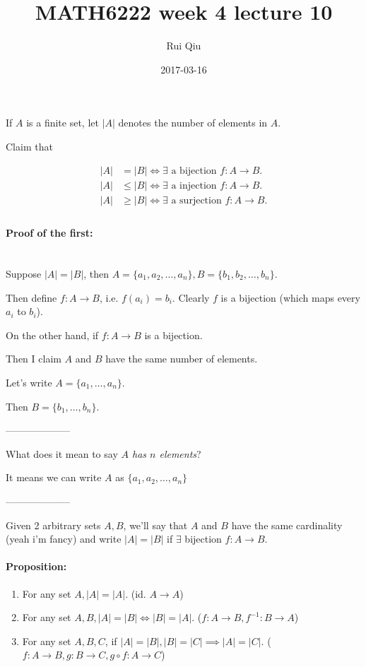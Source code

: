 \documentclass[a4paper, 11pt, twoside]{article}
\begin{document}
\title{MATH6222 week 4 lecture 10}
\author{Rui Qiu}
\date{2017-03-16}

\maketitle

If $A$ is a finite set, let $|A|$ denotes the number of elements in $A$.

Claim that

\[
\begin{split}
	|A|&=|B| \iff \exists \text{ a bijection } f: A\to B.\\	
	|A|&\leq |B| \iff \exists \text{ a injection } f: A\to B.\\
	|A|&\geq |B| \iff \exists \text{ a surjection } f: A \to B.\\
\end{split}
\]

\paragraph{Proof of the first:}\ \\

Suppose $|A|=|B|$, then $A=\{a_1, a_2, \dots, a_n\}, B=\{b_1,b_2,\dots, b_n\}.$

Then define $f:A\to B$, i.e. $f(a_i)=b_i.$ Clearly $f$ is a bijection (which maps every $a_i$ to $b_i$).

On the other hand, if $f:A\to B$ is a bijection.

Then I claim $A$ and $B$ have the same number of elements.

Let's write $A=\{a_1, \dots, a_n\}.$

Then $B=\{b_1,\dots, b_n\}.$

--------------------

What does it mean to say \textit{$A$ has $n$ elements}?

It means we can write $A$ as $\{a_1, a_2, \dots, a_n\}$

--------------------

Given 2 arbitrary sets $A, B$, we'll say that $A$ and $B$ have the same cardinality (yeah i'm fancy) and write $|A|=|B|$ if $\exists$ bijection $f:A\to B$.\\

\paragraph{Proposition:}
\begin{enumerate}
	\item For any set $A, |A|=|A|.$ (id. $A\to A$)
	\item For any set $A, B, |A|=|B| \iff |B| = |A|.$ ($f:A\to B, f^{-1}:B\to A$)
	\item For any set $A, B, C$, if $|A|=|B|, |B|=|C| \implies |A|=|C|.$ ($f:A\to B, g: B\to C, g\circ f:A\to C$)
\end{enumerate}
\end{document}
